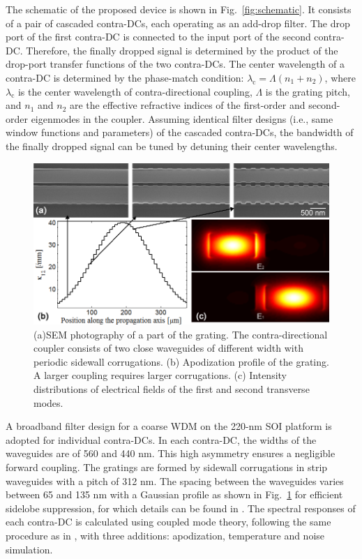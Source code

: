 \documentclass[osajnl,twocolumn,showpacs,superscriptaddress,10pt]{revtex4-1}
\begin{document}
The schematic of the proposed device is shown in Fig.~\ref{fig:schematic}. 
It consists of a pair of cascaded contra-DCs, each operating as an add-drop filter. 
The drop port of the first contra-DC is connected to the input port of the second contra-DC. 
Therefore, the finally dropped signal is determined by the product of the  drop-port transfer functions of the two contra-DCs. The center wavelength of a contra-DC is determined by the phase-match condition: $\lambda_\text{c} = \Lambda (n_\text{1}+n_\text{2})$, where $\lambda_\text{c}$ is the center wavelength of contra-directional coupling, $\Lambda$ is the grating pitch, and $n_\text{1}$ and $n_\text{2}$ are the effective refractive indices of the first-order and second-order eigenmodes in the coupler. 
Assuming identical filter designs (i.e., same window functions and parameters) of the cascaded contra-DCs, the bandwidth of the finally dropped signal can be tuned by detuning their center wavelengths.



\begin{figure}[htbp]
  \centering
  \includegraphics[width=1\columnwidth]{data/FigApod}
  \caption{(a)SEM photography of a part of the grating. The contra-directional coupler consists of two close waveguides of different width with periodic sidewall corrugations. (b) Apodization profile of the grating. A larger coupling requires larger corrugations. (c) Intensity distributions of electrical fields of the first and second transverse modes. }
  \label{fig:SEM}
\end{figure} 


A broadband filter design for a coarse WDM on the 220-nm SOI platform \cite{shi2013siliconCWDM} is adopted for individual contra-DCs.  
In each contra-DC, the widths of the waveguides are of 560 and 440 nm.
This high asymmetry ensures a negligible forward coupling. 
The gratings are formed by sidewall corrugations in strip waveguides with a pitch of 312 nm. 
The spacing between the waveguides varies between 65 and 135 nm with a Gaussian profile as shown in Fig.~\ref{fig:SEM} for efficient sidelobe suppression, for which details can be found in \cite{shi2013siliconCWDM}.
The spectral responses of each contra-DC is calculated using coupled mode theory, following the same procedure as in  \cite{shi2013siliconContraDC}, with three additions: apodization, temperature and noise simulation.
\end{document}
